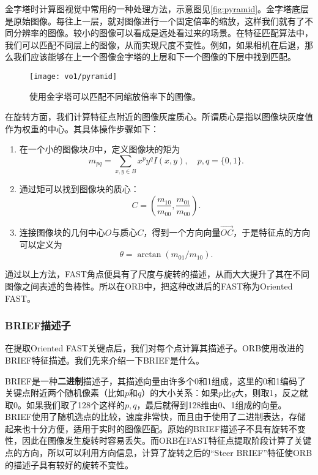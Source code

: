 金字塔时计算图视觉中常用的一种处理方法，示意图见\autoref{fig:pyramid}。金字塔底层是原始图像。每往上一层，就对图像进行一个固定倍率的缩放，这样我们就有了不同分辨率的图像。较小的图像可以看成是远处看过来的场景。在特征匹配算法中，我们可以匹配不同层上的图像，从而实现尺度不变性。例如，如果相机在后退，那么我们应该能够在上一个图像金字塔的上层和下一个图像的下层中找到匹配。

\begin{figure}[!t]
    \centering
    \texttt{[image: vo1/pyramid]}\\
    \caption{使用金字塔可以匹配不同缩放倍率下的图像。}
    \label{fig:pyramid}
\end{figure}

在旋转方面，我们计算特征点附近的图像灰度质心。所谓质心是指以图像块灰度值作为权重的中心。其具体操作步骤如下\textsuperscript{\cite{Rosin1999}}：
\begin{enumerate}
\item 在一个小的图像块$B$中，定义图像块的矩为
\[
m_{pq}=\sum_{x,y \in B}x^{p}y^{q}I(x,y), \quad p, q = \{0,1\}.
\]
\item 通过矩可以找到图像块的质心：
\[
C=(\frac{m_{10}}{m_{00}},\frac{m_{01}}{m_{00}}).
\]
\item 连接图像块的几何中心$O$与质心$C$，得到一个方向向量$\overrightarrow{OC}$，于是特征点的方向可以定义为
\[
\theta = \arctan(m_{01}/m_{10}).
\]
\end{enumerate}
通过以上方法，FAST角点便具有了尺度与旋转的描述，从而大大提升了其在不同图像之间表述的鲁棒性。所以在ORB中，把这种改进后的FAST称为Oriented FAST。

\subsubsection{BRIEF描述子}
在提取Oriented FAST关键点后，我们对每个点计算其描述子。ORB使用改进的BRIEF特征描述。我们先来介绍一下BRIEF是什么。

BRIEF是一种\textbf{二进制}描述子，其描述向量由许多个0和1组成，这里的0和1编码了关键点附近两个随机像素（比如$p$和$q$）的大小关系：如果$p$比$q$大，则取1，反之就取0。如果我们取了128个这样的$p,q$，最后就得到128维由0、1组成的向量\textsuperscript{\cite{calonder2010brief}}。BRIEF使用了随机选点的比较，速度非常快，而且由于使用了二进制表达，存储起来也十分方便，适用于实时的图像匹配。原始的BRIEF描述子不具有旋转不变性，因此在图像发生旋转时容易丢失。而ORB在FAST特征点提取阶段计算了关键点的方向，所以可以利用方向信息，计算了旋转之后的“Steer BRIEF”特征使ORB的描述子具有较好的旋转不变性。

